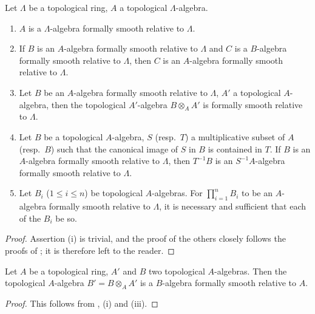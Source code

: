\begin{proposition}[19.9.2]
\label{0.19.9.2}
Let $\Lambda$ be a topological ring, $A$ a topological $\Lambda$-algebra.
\begin{enumerate}
  \item[\rm\textup{(i)}] $A$ is a $\Lambda$-algebra formally smooth relative to $\Lambda$.
  \item[\rm\textup{(ii)}] If $B$ is an $A$-algebra formally smooth relative to $\Lambda$ and $C$ is a $B$-algebra formally smooth relative to $\Lambda$, then $C$ is an $A$-algebra formally smooth relative to $\Lambda$.
  \item[\rm\textup{(iii)}] Let $B$ be an $A$-algebra formally smooth relative to $\Lambda$, $A'$ a topological $A$-algebra, then the topological $A'$-algebra $B\otimes_A A'$ is formally smooth relative to $\Lambda$.
  \item[\rm(iv)] Let $B$ be a topological $A$-algebra, $S$ \textup{(resp.\ $T$)} a multiplicative subset of $A$ \textup{(resp.\ $B$)} such that the canonical image of $S$ in $B$ is contained in $T$.
If $B$ is an $A$-algebra formally smooth relative to $\Lambda$, then $T^{-1}B$ is an $S^{-1}A$-algebra formally smooth relative to $\Lambda$.
  \item[\rm(v)] Let $B_i$ ($1\leq i\leq n$) be topological $A$-algebras.
For $\prod_{i=1}^n B_i$ to be an $A$-algebra formally smooth relative to $\Lambda$, it is necessary and sufficient that each of the $B_i$ be so.
\end{enumerate}
\end{proposition}

\begin{proof}
Assertion (i) is trivial, and the proof of the others closely follows the proofs of ; it is therefore left to the reader.
\end{proof}

\begin{corollary}[19.9.3]
\label{0.19.9.3}
Let $A$ be a topological ring, $A'$ and $B$ two topological $A$-algebras.
Then the topological $A$-algebra $B'=B\otimes_A A'$ is a $B$-algebra formally smooth relative to $A$.
\end{corollary}

\begin{proof}
This follows from , (i) and (iii).
\end{proof}

